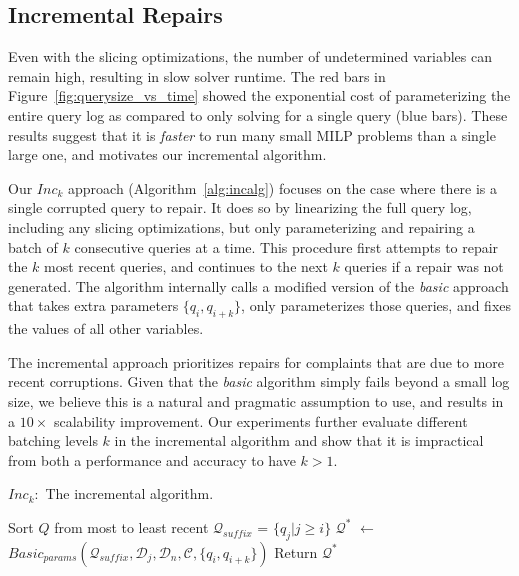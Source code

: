 \subsection{Incremental Repairs}\label{sec:incremental}



Even with the slicing optimizations, the number of undetermined variables can remain high, resulting in slow solver runtime.  
The red bars in Figure~\ref{fig:querysize_vs_time} showed the exponential cost of parameterizing the entire query log as compared to only solving for a single query (blue bars).
These results suggest that it is \emph{faster} to run many small MILP problems than a single large one, and motivates our incremental algorithm.

Our \emph{$Inc_k$} approach (Algorithm~\ref{alg:incalg}) focuses on the case where there is a single corrupted query to repair.
It does so by linearizing the full query log, including any slicing optimizations, but only parameterizing and repairing a batch of $k$ consecutive queries at a time. 
This procedure first attempts to repair the $k$ most recent queries, and continues to the next $k$ queries if a repair was not generated.
The algorithm internally calls a modified version of the \emph{basic} approach that takes extra parameters $\{q_i, q_{i+k}\}$, only parameterizes those queries, and fixes the values of all other variables.

The incremental approach prioritizes repairs for complaints that are due to more recent corruptions.
Given that the \emph{basic} algorithm simply fails beyond a small log size, we believe this is a natural and pragmatic assumption to use, and results in 
a $10\times$ scalability improvement.
Our experiments further evaluate different batching levels $k$ in the incremental algorithm and show that it is impractical from both a performance and accuracy to have $k > 1$.


\begin{algorithm}[t]
\caption{$Inc_k:$ The incremental algorithm. 
}
\scriptsize
\label{alg:incalg}
\begin{algorithmic}[2]
\STATE Sort $Q$ from most to least recent
  \STATE $\mathcal{Q}_{suffix}$ = $\{q_j | j \ge i \}$ 
  \STATE $\mathcal{Q}^*$ $\leftarrow$ $Basic_{params}(\mathcal{Q}_{suffix}, \mathcal{D}_j, \mathcal{D}_n, \mathcal{C}, \{q_i, q_{i+k}\})$
    \STATE Return $\mathcal{Q}^*$
  \ENDIF
\ENDFOR
\end{algorithmic}
\end{algorithm}



